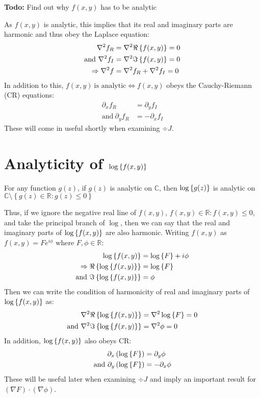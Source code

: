 \documentclass{article}
\begin{document}
\textbf{Todo:} Find out why $f(x,y)$ has to be analytic

As $f(x,y)$ is analytic, this implies that its real and imaginary parts are
harmonic and thus obey the Laplace equation:
\begin{align}
                   \nabla^2 f_R &= \nabla^2 \Re \left\{ f(x,y) \right\} = 0 \\
    \textrm{and} ~ \nabla^2 f_I &= \nabla^2 \Im \left\{ f(x,y) \right\} = 0 \\
    \Rightarrow    \nabla^2 f   &= \nabla^2 f_R + \nabla^2 f_I = 0
\end{align}
In addition to this, $f(x,y) ~ \textrm{is analytic} \Leftrightarrow f(x,y)$
obeys the Cauchy-Riemann (CR) equations:
\begin{align}
    \partial_x f_R &= \partial_y f_I \\
    \textrm{and} ~ \partial_y f_R &= - \partial_x f_I
\end{align}
These will come in useful shortly when examining $\div{J}$.

\section{Analyticity of $\log \left\{ f(x,y) \right\}$}

For any function $g(z)$, if $g(z)$ is analytic on $\mathbb{C}$, then
$\log \left\{ g(z) \right\}$ is analytic on $\mathbb{C} \setminus \left\{ g(z) \in
\mathbb{R} : g(z) \leq 0 \right\}$ %

Thus, if we ignore the negative real line of $f(x,y)$, $f(x,y) \in \mathbb{R} :
f(x,y) \leq 0$, and take the principal branch of $\log$, then we can say that
the real and imaginary parts of $\log \left\{ f(x,y) \right\}$ are also harmonic. Writing
$f(x,y)$ as $f(x,y) = F e^{i \phi}$ where $F, \phi \in \mathbb{R}$:
\begin{align}
    \log \left\{ f(x,y) \right\} &= \log \left\{ F \right\} + i \phi \\
    \Rightarrow \Re \left\{ \log \left\{ f(x,y) \right\} \right\} &= \log \left\{ F \right\} \\
    \textrm{and} ~ \Im \left\{ \log \left\{ f(x,y) \right\} \right\} &= \phi
\end{align}
Then we can write the condition of harmonicity of real and imaginary parts of
$\log \left\{ f(x,y) \right\}$ as:
\begin{align}
    \nabla^2 \Re \left\{ \log \left\{ f(x,y) \right\} \right\} &= \nabla^2 \log \left\{ F \right\} = 0 \\
    \textrm{and} ~ \nabla^2 \Im \left\{ \log \left\{ f(x,y) \right\} \right\} &= \nabla^2 \phi = 0
\end{align}
In addition, $\log \left\{ f(x,y) \right\}$ also obeys CR:
\begin{align}
    \partial_x \left( \log \left\{ F \right\} \right) &= \partial_y \phi \\
    \textrm{and}~ \partial_y \left( \log \left\{ F \right\} \right) &= - \partial_x \phi
\end{align}
These will be useful later when examining $\div{J}$ and imply an important
result for $\left(\nabla F\right) \cdot \left(\nabla \phi\right)$.
\end{document}
